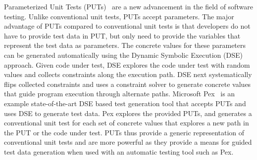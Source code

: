 Parameterized Unit Tests (PUTs)~\cite{tillmann05:parameterized} are a new advancement in the field of software testing. Unlike conventional unit tests, PUTs accept parameters. The major advantage of PUTs compared to conventional unit tests is that developers do not have to provide test data in PUT, but only need to provide the variables that represent the test data as parameters. The concrete values for these parameters can be generated automatically using the Dynamic Symbolic Execution (DSE)~\cite{king:symex, godefroid05:dart, sen07:cute} approach. Given code under test, DSE explores the code under test with random values and collects constraints along the execution path. DSE next systematically flips collected constraints and uses a constraint solver to generate concrete values that guide program execution through alternate paths. Microsoft Pex~\cite{tillmann08:pex, pex:rel} is an example state-of-the-art DSE based test generation tool that accepts PUTs and uses DSE to generate test data. Pex explores the provided PUTs, and generates a conventional unit test for each set of concrete values that explores a new path in the PUT or the code under test. PUTs thus provide a generic representation of conventional unit tests and are more powerful as they provide a means for guided test data generation when used with an automatic testing tool such as Pex. 

